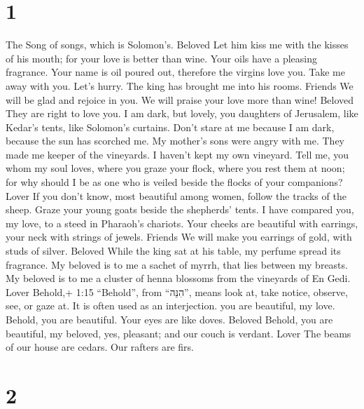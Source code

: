 \hypertarget{section}{%
\section{1}\label{section}}

 The Song of songs, which is Solomon's. Beloved 
Let him kiss me with the kisses of his mouth; for your love is better
than wine.  Your oils have a pleasing fragrance. Your name
is oil poured out, therefore the virgins love you.  Take me
away with you. Let's hurry. The king has brought me into his rooms.
Friends We will be glad and rejoice in you. We will praise your love
more than wine! Beloved They are right to love you.  I am
dark, but lovely, you daughters of Jerusalem, like Kedar's tents, like
Solomon's curtains.  Don't stare at me because I am dark,
because the sun has scorched me. My mother's sons were angry with me.
They made me keeper of the vineyards. I haven't kept my own vineyard.
 Tell me, you whom my soul loves, where you graze your
flock, where you rest them at noon; for why should I be as one who is
veiled beside the flocks of your companions? Lover  If you
don't know, most beautiful among women, follow the tracks of the sheep.
Graze your young goats beside the shepherds' tents.  I have
compared you, my love, to a steed in Pharaoh's chariots. 
Your cheeks are beautiful with earrings, your neck with strings of
jewels. Friends  We will make you earrings of gold, with
studs of silver. Beloved  While the king sat at his table,
my perfume spread its fragrance.  My beloved is to me a
sachet of myrrh, that lies between my breasts.  My beloved
is to me a cluster of henna blossoms from the vineyards of En Gedi.
Lover  Behold,+ 1:15 ``Behold'', from ``הִנֵּה'', means
look at, take notice, observe, see, or gaze at. It is often used as an
interjection. you are beautiful, my love. Behold, you are beautiful.
Your eyes are like doves. Beloved  Behold, you are
beautiful, my beloved, yes, pleasant; and our couch is verdant. Lover
 The beams of our house are cedars. Our rafters are firs.

\hypertarget{section-1}{%
\section{2}\label{section-1}}

